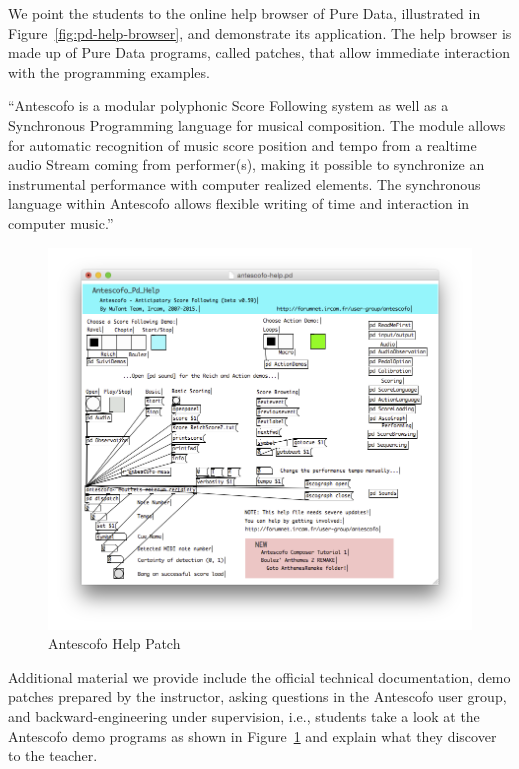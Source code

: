 \documentclass[onecolumn,nocopyrightspace,preprint]{sigplanconf}
\begin{document}
\begin{description}
We point the students to the online help browser of Pure Data, illustrated in
Figure~\ref{fig:pd-help-browser}, and demonstrate its application. The help
browser is made up of Pure Data programs, called patches, that allow immediate
interaction with the programming examples.

``Antescofo is a modular polyphonic Score Following system as well as a
Synchronous Programming language for musical composition. The module allows
for automatic recognition of music score position and tempo from a realtime
audio Stream coming from performer(s), making it possible to synchronize an
instrumental performance with computer realized elements. The synchronous
language within Antescofo allows flexible writing of time and interaction in
computer music.''~\cite{website:antescofo}

\begin{figure}[ht]
    \centering
    \includegraphics[scale=0.5]{fig/ascohelp.png}
    \caption{Antescofo Help Patch}
    \label{fig:ascohelp}
\end{figure}

Additional material we provide include the official technical documentation,
demo patches prepared by the instructor, asking questions in the Antescofo
user group, and backward-engineering under supervision, i.e., students take a
look at the Antescofo demo programs as shown in Figure~\ref{fig:ascohelp} and
explain what they discover to the teacher.



\end{description}
\end{document}
